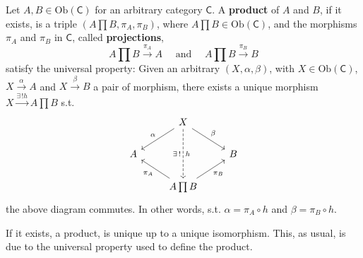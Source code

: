 \begin{defn}[Product]
	Let $A, B \in \mathrm{Ob} \left(\mathsf{C}\right)$ for an arbitrary category $\mathsf{C}$.
	A \textbf{product} of $A$ and $B$, if it exists, is a triple $\left(A \prod B, \pi_A, \pi_B \right)$, where $A \prod B \in \mathrm{Ob} \left(\mathsf{C}\right)$, and the morphisms $\pi_A$ and $\pi_B$ in $\mathsf{C}$, called \textbf{projections}, 
	 \begin{equation}
	A \prod B \xrightarrow{\pi_A} A \quad \text{ and } \quad A \prod B \xrightarrow{\pi_B} B
	\end{equation} 
	satisfy the universal property:
	Given an arbitrary $\left(X, \alpha, \beta\right)$, with $X \in \mathrm{Ob} \left(\mathsf{C}\right)$, $X \xrightarrow{\alpha} A$ and $X \xrightarrow{\beta} B$ a pair of morphism, there exists a unique morphism $X \xrightarrow{\exists\, ! h} A \prod B$ s.t.
	\begin{equation}
	\begin{tikzcd}
		& X \arrow[ld, "\alpha"', rightarrow] \arrow[rd, "\beta", rightarrow] \arrow[dd, "h", "\exists\, !"', dashrightarrow] \\
		A & & B\\
		  & A \prod B \arrow[lu, "\pi_A", rightarrow] \arrow[ru, "\pi_B"', rightarrow] &
	\end{tikzcd}
	\end{equation} 
	the above diagram commutes.
	In other words, s.t. $\alpha = \pi_A \circ h$ and $\beta = \pi_B \circ h$.
\end{defn}

\begin{rem}
	If it exists, a product, is unique up to a unique isomorphism.
	This, as usual, is due to the universal property used to define the product.
\end{rem}

